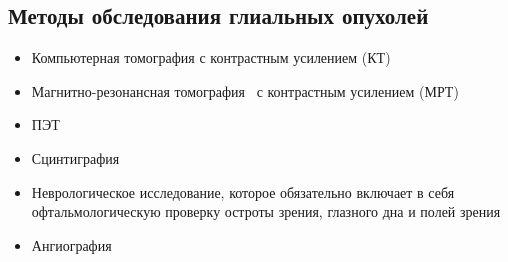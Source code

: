 \subsection{Методы обследования глиальных опухолей}

\begin{frame}
  \begin{itemize}
    \frametitle{Методы обследования глиальных опухолей}
    \item Компьютерная томография с контрастным усилением (КТ)
    \item Магнитно-резонансная томография  с контрастным усилением (МРТ)
    \item ПЭТ 
    \item Сцинтиграфия
    \item Неврологическое исследование, которое обязательно включает в себя офтальмологическую проверку остроты зрения, глазного дна и полей зрения
    \item Ангиография
  \end{itemize}
\end{frame}